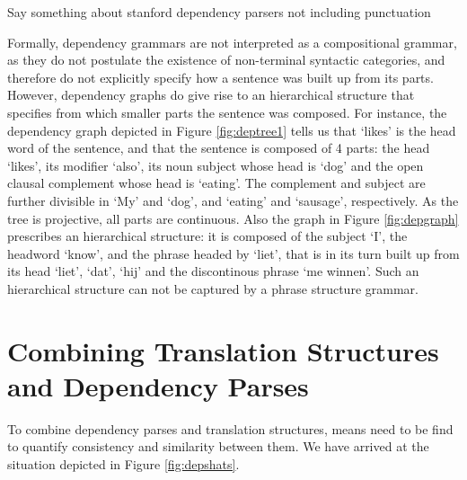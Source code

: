 \documentclass{report}
\theoremstyle{break}
\begin{document}
Say something about stanford dependency parsers not including punctuation


Formally, dependency grammars are not interpreted as a compositional grammar, as they do not postulate the existence of non-terminal syntactic categories, and therefore do not explicitly specify how a sentence was built up from its parts. However, dependency graphs do give rise to an hierarchical structure that specifies from which smaller parts the sentence was composed. For instance, the dependency graph depicted in Figure \ref{fig:deptree1} tells us that `likes' is the head word of the sentence, and that the sentence is composed of 4 parts: the head `likes', its modifier `also', its noun subject whose head is `dog' and the open clausal complement whose head is `eating'. The complement and subject are further divisible in `My' and `dog', and `eating' and `sausage', respectively. As the tree is projective, all parts are continuous. Also the graph in Figure \ref{fig:depgraph} prescribes an hierarchical structure: it is composed of the subject `I', the headword `know', and the phrase headed by `liet', that is in its turn built up from its head `liet', `dat', `hij' and the discontinous phrase `me winnen'. Such an hierarchical structure can not be captured by a phrase structure grammar.

\section{Combining Translation Structures and Dependency Parses}

To combine dependency parses and translation structures, means need to be find to quantify consistency and similarity between them. We have arrived at the situation depicted in Figure \ref{fig:depshats}.
\end{document}
